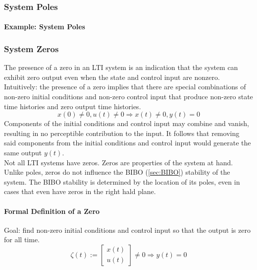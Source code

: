 \documentclass[../notes.tex]{subfiles}
\begin{document}
\subsubsection{System Poles}

\paragraph{Example: System Poles}

\subsubsection{System Zeros}
The presence of a zero in an LTI system is an indication that the system can exhibit zero output even when the state and control input are nonzero. Intuitively: the presence of a zero implies that there are special combinations of non-zero initial conditions and non-zero control input that produce non-zero state time histories and zero output time histories.
\begin{equation*}
    x(0) \neq 0, u(t) \neq 0 \Rightarrow x(t) \neq 0, y(t) = 0
\end{equation*}
Components of the initial conditions and control input may combine and vanish, resulting in no perceptible contribution to the input. It follows that removing said components from the initial conditions and control input would generate the same output $y(t)$. \\
Not all LTI systems have zeros. Zeros are properties of the system at hand. Unlike poles, zeros do not influence the BIBO (\underline{\ref{sec:BIBO}}) stability of the system. The BIBO stability is determined by the location of its poles, even in cases that even have zeros in the right hald plane.

\paragraph{Formal Definition of a Zero}
Goal: find non-zero initial conditions and control input so that the output is zero for all time.
\begin{equation*}
    \zeta (t) := \begin{bmatrix}
        x(t) \\ u(t)
    \end{bmatrix} \neq 0 \Rightarrow y(t) = 0
\end{equation*}
\end{document}
